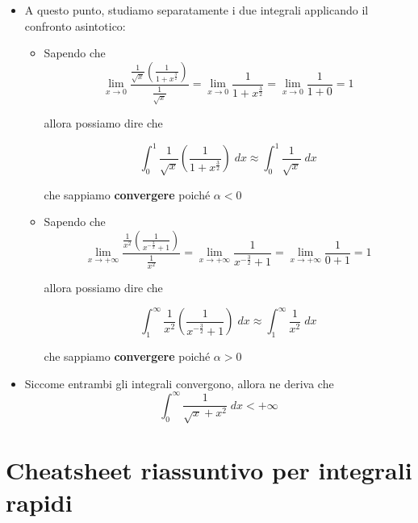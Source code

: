 \documentclass[a4paper, 12pt]{report}
\begin{document}
    \begin{itemize}
        \item A questo punto, studiamo separatamente i due integrali applicando il confronto asintotico:
        
        \begin{itemize}
            \item Sapendo che
            \[ \lim_{x \to 0} \frac{\frac{1}{\sqrt{x}} \left ( \frac{1}{1+x^{\frac{3}{2}}} \right )}{\frac{1}{\sqrt{x}}} = \lim_{x \to 0} \frac{1}{1+x^{\frac{3}{2}}} = \lim_{x \to 0} \frac{1}{1+0} = 1\]
            
            allora possiamo dire che
            
            \[ \int_{0}^{1} \frac{1}{\sqrt{x}} \left ( \frac{1}{1+x^{\frac{3}{2}}} \right ) \; dx \approx \int_{0}^{1} \frac{1}{\sqrt{x}} \; dx\]
            
            che sappiamo \textbf{convergere} poiché $\alpha < 0$
            
            \item Sapendo che
            \[ \lim_{x \to +\infty} \frac{\frac{1}{x^2} \left ( \frac{1}{x^{-\frac{3}{2}} + 1} \right )}{\frac{1}{x^2}} = \lim_{x \to +\infty} \frac{1}{x^{-\frac{3}{2}} + 1} = \lim_{x \to +\infty} \frac{1}{0 + 1} = 1\]
            
            allora possiamo dire che
            
            \[ \int_{1}^{\infty} \frac{1}{x^2} \left ( \frac{1}{x^{-\frac{3}{2}} + 1} \right ) \; dx \approx \int_{1}^{\infty} \frac{1}{x^2} \; dx\]
            
            che sappiamo \textbf{convergere} poiché $\alpha > 0$
        \end{itemize}
        
        \item Siccome entrambi gli integrali convergono, allora ne deriva che
        \[ \int_{0}^{\infty} \frac{1}{\sqrt{x}+x^2} \; dx < +\infty\]
    \end{itemize}
    
        \section{Cheatsheet riassuntivo per integrali rapidi}
        
\end{document}
